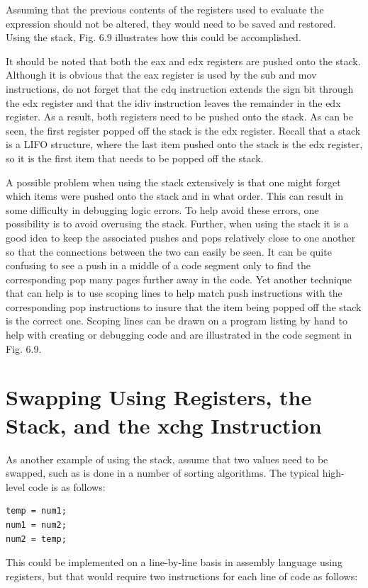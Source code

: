 \documentclass[10pt]{book}
\begin{document}
Assuming that the previous contents of the registers used to evaluate the expression should not be altered, they would need to be saved and restored. Using the stack, Fig. 6.9 illustrates how this could be accomplished.

It should be noted that both the eax and edx registers are pushed onto the stack. Although it is obvious that the eax register is used by the sub and mov instructions, do not forget that the cdq instruction extends the sign bit through the edx register and that the idiv instruction leaves the remainder in the edx register. As a result, both registers need to be pushed onto the stack. As can be seen, the first register popped off the stack is the edx register. Recall that a stack is a LIFO structure, where the last item pushed onto the stack is the edx register, so it is the first item that needs to be popped off the stack.

A possible problem when using the stack extensively is that one might forget which items were pushed onto the stack and in what order. This can result in some difficulty in debugging logic errors. To help avoid these errors, one possibility is to avoid overusing the stack. Further, when using the stack it is a good idea to keep the associated pushes and pops relatively close to one another so that the connections between the two can easily be seen. It can be quite confusing to see a push in a middle of a code segment only to find the corresponding pop many pages further away in the code. Yet another technique that can help is to use scoping lines to help match push instructions with the corresponding pop instructions to insure that the item being popped off the stack is the correct one. Scoping lines can be drawn on a program listing by hand to help with creating or debugging code and are illustrated in the code segment in Fig. 6.9.

\section{Swapping Using Registers, the Stack, and the xchg Instruction}
As another example of using the stack, assume that two values need to be swapped, such as is done in a number of sorting algorithms. The typical high-level code is as follows:

\begin{verbatim}
temp = num1;
num1 = num2;
num2 = temp;
\end{verbatim}

This could be implemented on a line-by-line basis in assembly language using registers, but that would require two instructions for each line of code as follows:
\end{document}
